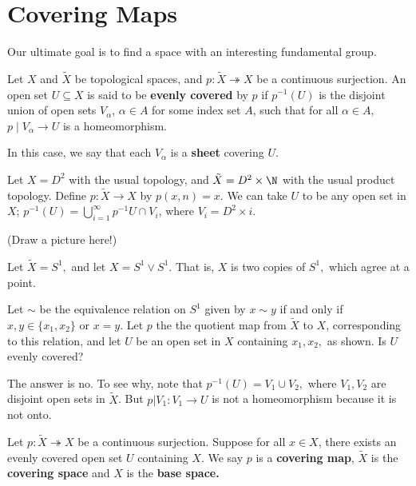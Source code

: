 \section{Covering Maps}

Our ultimate goal is to find a space with an interesting fundamental group.  

\begin{definition}  Let $X$ and $\tilde{X}$ be topological spaces, and $p:\tilde{X}\twoheadrightarrow X$ be a continuous surjection.  An open set $U \subseteq X$ is said to be \textbf{evenly covered} by $p$ if $p^{-1}(U)$ is the disjoint union of open sets $V_{\alpha}$, $\alpha \in A$ for some index set $A$, such that for all $\alpha \in A,$ $p \mid V_{\alpha} \rightarrow U$ is a homeomorphism.  

In this case, we say that each $V_{\alpha}$ is a \textbf{sheet} covering $U$.
\end{definition}


\begin{example}
 Let $X=D^2$ with the usual topology, and $\tilde{X}=D^2 \times \N$ with the usual product topology.  Define $p:\tilde{X} \rightarrow X$ by $p(x,n)=x.$  We can take $U$ to be any open set in $X$; $\displaystyle p^{-1}(U)=\bigcup_{i=1}^{\infty}p^{-1}{U}\cap V_i$, where $V_i=D^2 \times i$.

(Draw a picture here!)
\placeholder
\end{example}

\begin{example}
Let $\tilde{X}=S^1,$ and let $X=S^1 \lor S^1.$  That is, $X$ is two copies of $S^1,$ which agree at a point.  

Let $\sim$ be the equivalence relation on $S^1$ given by $x \sim y$ if and only if $x,y \in \{x_1,x_2\}$ or $x=y$.  Let $p$ the the quotient map from $\tilde{X}$ to $X$, corresponding to this relation, and let $U$ be an open set in $X$ containing $x_1,x_2,$ as shown.  Is $U$ evenly covered?

The answer is no.  To see why, note that $p^{-1}(U)=V_1 \cup V_2,$ where $V_1,V_2$ are disjoint open sets in $\tilde{X}$.  But $p \vert V_1: V_1 \rightarrow U$ is not a homeomorphism because it is not onto.  
\end{example}

\begin{definition}  Let $p: \tilde{X} \twoheadrightarrow X$ be a continuous surjection.  Suppose for all $x \in X$, there exists an evenly covered open set $U$ containing $X$.   We say $p$ is a \textbf{covering map}, $\tilde{X}$ is the \textbf{covering space} and $X$ is the \textbf{base space.}
\end{definition}

